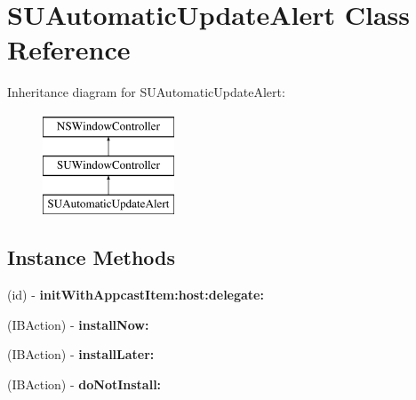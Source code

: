 \hypertarget{interface_s_u_automatic_update_alert}{}\section{S\+U\+Automatic\+Update\+Alert Class Reference}
\label{interface_s_u_automatic_update_alert}
Inheritance diagram for S\+U\+Automatic\+Update\+Alert\+:\begin{figure}[H]
\begin{center}
\leavevmode
\includegraphics[height=3.000000cm]{interface_s_u_automatic_update_alert}
\end{center}
\end{figure}
\subsection*{Instance Methods}
\begin{DoxyCompactItemize}
\item 
\mbox{\label{interface_s_u_automatic_update_alert_aa30aba2d568ae8ff2c9b2ab62d935902}} 
(id) -\/ {\bfseries init\+With\+Appcast\+Item\+:host\+:delegate\+:}
\item 
\mbox{\label{interface_s_u_automatic_update_alert_a3a6857f442f4cae0dd8ad5d4ad7fe518}} 
(I\+B\+Action) -\/ {\bfseries install\+Now\+:}
\item 
\mbox{\label{interface_s_u_automatic_update_alert_ab5a02ccc6fa792402a92bee3ee7ecb5d}} 
(I\+B\+Action) -\/ {\bfseries install\+Later\+:}
\item 
\mbox{\label{interface_s_u_automatic_update_alert_a0fd6f488e298ae08cf67b0ce4416462e}} 
(I\+B\+Action) -\/ {\bfseries do\+Not\+Install\+:}
\end{DoxyCompactItemize}
